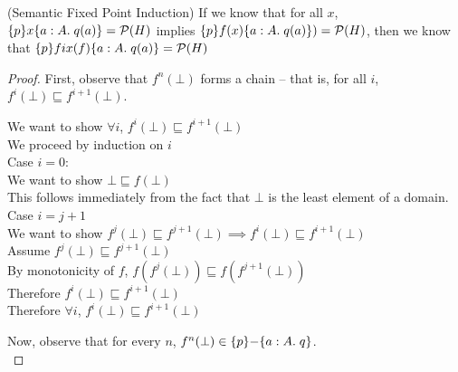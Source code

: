 \begin{lemma}{(Semantic Fixed Point Induction)}
If we know that for all $x$, $\{{p}\}{x}\{{a:A}.\;{q(a)}\} = \mathcal{P}(H)$ implies $\{{p}\}{f(x)}\{{a:A}.\;{q(a)}\}) = \mathcal{P}(H)$, then we know that $\{{p}\}{fix(f)}\{{a:A}.\;{q(a)}\} = \mathcal{P}(H)$
\end{lemma}

\begin{proof}
First, observe that $f^n(\bot)$ forms a chain -- that is, for all $i$, $f^i(\bot) \sqsubseteq f^{i+1}(\bot)$.
\begin{tabbedproof}
\oo We want to show $\forall i$, $f^i(\bot) \sqsubseteq f^{i+1}(\bot)$ \\
\oo We proceed by induction on $i$ \\
\ooo Case $i = 0$: \\
\oooo We want to show $\bot \sqsubseteq f(\bot)$ \\
\oooo This follows immediately from the fact that $\bot$ is the least element of a domain. \\
\ooo Case $i = j + 1$ \\
\oooo We want to show $f^j(\bot) \sqsubseteq f^{j+1}(\bot) \implies f^i(\bot) \sqsubseteq f^{i+1}(\bot)$ \\
\oooo Assume $f^j(\bot) \sqsubseteq f^{j+1}(\bot)$ \\
\ooooo By monotonicity of $f$, $f(f^j(\bot)) \sqsubseteq f(f^{j+1}(\bot))$ \\
\ooooo Therefore $f^i(\bot) \sqsubseteq f^{i+1}(\bot)$ \\
\oo Therefore $\forall i$, $f^i(\bot) \sqsubseteq f^{i+1}(\bot)$ \\
\end{tabbedproof}

\noindent Now, observe that for every $n$, $f^n(\bot) \in \{{p}\}{-}\{{a:A}.\;{q}\}$. \\


\end{proof}
